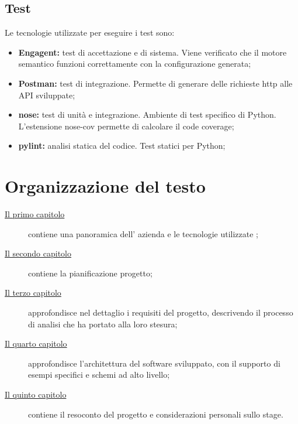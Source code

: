 \subsection{Test}
Le tecnologie utilizzate per eseguire i test sono:
\begin{itemize}
    \item \textbf{Engagent:} test di accettazione e di sistema. Viene verificato che il motore semantico funzioni correttamente con la configurazione generata;
    \item \textbf{Postman:} test di integrazione. Permette di generare delle richieste http alle API sviluppate;
    \item \textbf{nose:} test di unità e integrazione. Ambiente di test specifico di Python. L'estensione nose-cov permette di calcolare il code coverage;
    \item \textbf{pylint:} analisi statica del codice. Test statici per Python;
\end{itemize}

\section{Organizzazione del testo}

\begin{description}
    \item[{\hyperref[cap:introduzione]{Il primo capitolo}}] contiene una panoramica dell' azienda e le tecnologie utilizzate \company;

    \item[{\hyperref[cap:descrizione-stage]{Il secondo capitolo}}] contiene la pianificazione progetto; 
    
    \item[{\hyperref[cap:analisi-requisiti]{Il terzo capitolo}}] approfondisce nel dettaglio i requisiti del progetto, descrivendo il processo di analisi che ha portato alla loro stesura;
    
    \item[{\hyperref[cap:progettazione-codifica]{Il quarto capitolo}}] approfondisce l'architettura del software sviluppato, con il supporto di esempi specifici e schemi ad alto livello;
        
    \item[{\hyperref[cap:conclusioni]{Il quinto capitolo}}] contiene il resoconto del progetto e considerazioni personali sullo stage. 
\end{description}